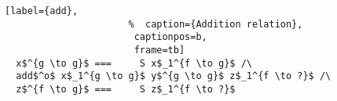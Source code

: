 \begin{figure}[!t]
  \centering
  \begin{minipage}{\columnwidth}
    \begin{lstlisting}[label={add},
                      %  caption={Addition relation},
                       captionpos=b,
                       frame=tb]
  x$^{g \to g}$ ===     S x$_1^{f \to g}$ /\
  add$^o$ x$_1^{g \to g}$ y$^{g \to g}$ z$_1^{f \to ?}$ /\
  z$^{f \to g}$ ===     S z$_1^{f \to ?}$
    \end{lstlisting}
  \end{minipage}
\end{figure}
